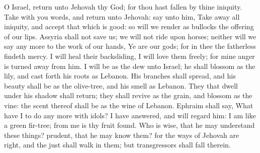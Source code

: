 O Israel, return unto Jehovah thy God; for thou hast fallen by thine iniquity. Take with you words, and return unto Jehovah: say unto him, Take away all iniquity, and accept that which is good: so will we render as bullocks the offering of our lips. Assyria shall not save us; we will not ride upon horses; neither will we say any more to the work of our hands, Ye are our gods; for in thee the fatherless findeth mercy.  I will heal their backsliding, I will love them freely; for mine anger is turned away from him. I will be as the dew unto Israel; he shall blossom as the lily, and cast forth his roots as Lebanon. His branches shall spread, and his beauty shall be as the olive-tree, and his smell as Lebanon. They that dwell under his shadow shall return; they shall revive as the grain, and blossom as the vine: the scent thereof shall be as the wine of Lebanon. Ephraim shall say, What have I to do any more with idols? I have answered, and will regard him: I am like a green fir-tree; from me is thy fruit found.  Who is wise, that he may understand these things? prudent, that he may know them? for the ways of Jehovah are right, and the just shall walk in them; but transgressors shall fall therein. 